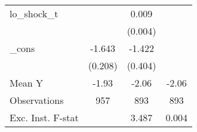 {\begin{tabular}{l*{3}{c}}
\addlinespace
lo\_shock\_t  &                     &       0.009\sym{**} &                     \\
            &                     &     (0.004)         &                     \\
\addlinespace
\_cons      &      -1.643\sym{***}&      -1.422\sym{***}&                     \\
            &     (0.208)         &     (0.404)         &                     \\
\midrule
Mean Y      &       -1.93         &       -2.06         &       -2.06         \\
Observations&         957         &         893         &         893         \\
Exc. Inst. F-stat&                     &       3.487         &       0.004         \\
\bottomrule
\end{tabular}
}
